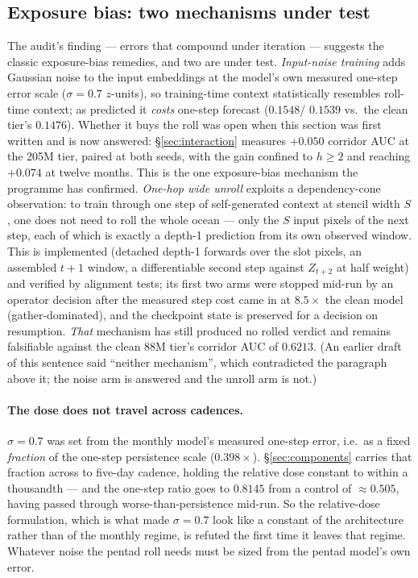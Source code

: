 \documentclass[10pt]{article}
\begin{document}
\subsection{Exposure bias: two mechanisms under test}\label{sec:exposure}

The audit's finding --- errors that compound under iteration ---
suggests the classic exposure-bias remedies, and two are under test.
\emph{Input-noise training} adds Gaussian noise to the input embeddings
at the model's own measured one-step error scale ($\sigma=0.7$
$z$-units), so training-time context statistically resembles roll-time
context; as predicted it \emph{costs} one-step forecast ($0.1548$/
$0.1539$ vs.\ the clean tier's $0.1476$). Whether it buys the roll was
open when this section was first written and is now answered:
\S\ref{sec:interaction} measures $+0.050$ corridor AUC at the 205M
tier, paired at both seeds, with the gain confined to $h\ge2$
and reaching $+0.074$ at twelve months. This is the one exposure-bias
mechanism the programme has confirmed. \emph{One-hop wide unroll} exploits a
dependency-cone observation: to train through one step of self-generated
context at stencil width $S$, one does not need to roll the whole
ocean --- only the $S$ input pixels of the next step, each of which is
exactly a depth-1 prediction from its own observed window. This is
implemented (detached depth-1 forwards over the slot pixels, an
assembled $t{+}1$ window, a differentiable second step against
$Z_{t+2}$ at half weight) and verified by alignment tests; its first
two arms were stopped mid-run by an operator decision after the
measured step cost came in at $8.5\times$ the clean model
(gather-dominated), and the checkpoint state is preserved for a
decision on resumption. \emph{That} mechanism has still produced no rolled
verdict and remains falsifiable against the clean 88M tier's corridor AUC
of $0.6213$. (An earlier draft of this sentence said ``neither
mechanism'', which contradicted the paragraph above it; the noise arm is
answered and the unroll arm is not.)

\paragraph{The dose does not travel across cadences.} $\sigma=0.7$ was set
from the monthly model's measured one-step error, i.e.\ as a fixed
\emph{fraction} of the one-step persistence scale ($0.398\times$).
\S\ref{sec:components} carries that fraction across to five-day cadence,
holding the relative dose constant to within a thousandth --- and the
one-step ratio goes to $0.8145$ from a control of $\approx$$0.505$, having
passed through worse-than-persistence mid-run. So the relative-dose
formulation, which is what made $\sigma=0.7$ look like a constant of the
architecture rather than of the monthly regime, is refuted the first time
it leaves that regime. Whatever noise the pentad roll needs must be sized
from the pentad model's own error.
\end{document}
